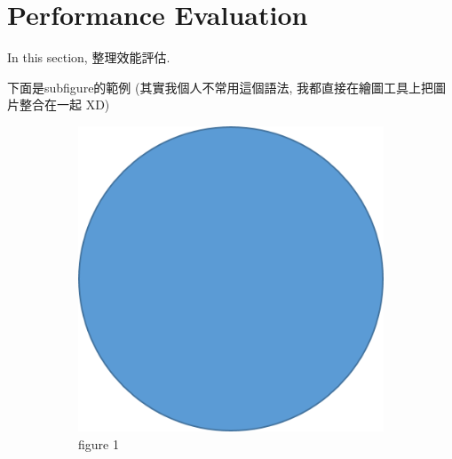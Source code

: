 \chapter{Performance Evaluation}
\label{ch:evaluation}

In this section, 整理效能評估.

下面是subfigure的範例 (其實我個人不常用這個語法, 我都直接在繪圖工具上把圖片整合在一起 XD)

\begin{figure}
     \centering
     \begin{subfigure}[]{0.3\textwidth}
         \centering
         \includegraphics[width=\textwidth]{img/fig1.png}
         \caption{figure 1}
         \label{fig:11111}
     \end{subfigure}
     \hfill
     \begin{subfigure}[]{0.3\textwidth}
         \centering

\end{subfigure}
\end{figure}
